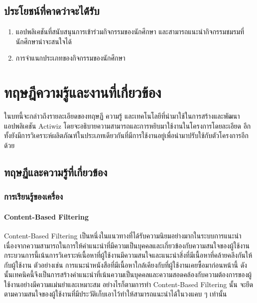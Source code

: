 \documentclass[14pt,oneside,openright,a4paper]{cpe-thai-project}
\begin{document}
\section{ประโยชน์ที่คาดว่าจะได้่รับ}
  \begin{enumerate}
    \item แอปพลิเคชันที่สนับสนุนการเข้าร่วมกิจกรรมของนักศึกษา และสามารถแนะนำกิจกรรมชมรมที่นักศึกษาน่าจะสนใจได้
    \item การจำแนกประเภทของกิจกรรมของนักศึกษา
  \end{enumerate}


\chapter{ทฤษฎีความรู้และงานที่เกี่ยวข้อง}
ในบทนี้จะกล่าวถึงรายละเอียดของทฤษฏี ความรู้ และเทคโนโลยีที่นำมาใช้ในการสร้างและพัฒนาแอปพลิเคชัน Actiwiz โดยจะอธิบายความสามารถและการหยิบมาใช้งานในโครงการโดยละเอียด อีกทั้งยังมีการวิเคราะห์ผลิตภัณฑ์ในประเภทเดียวกันที่มีการใช้งานอยู่เพื่อนำมาปรับใช้กับตัวโครงการอีกด้วย

\section{ทฤษฏีและความรู้ที่เกี่ยวข้อง}
  \subsection {การเรียนรู้ของเครื่อง}
  \subsubsection {Content-Based Filtering}
Content-Based Filtering \cite{Content-Based} เป็นหนึ่งในแนวทางที่ได้รับความนิยมอย่างมากในระบบการแนะนำ เนื่องจากความสามารถในการให้คำแนะนำที่มีความเป็นบุคคลและเกี่ยวข้องกับความสนใจของผู้ใช้งาน 
กระบวนการนี้เน้นการวิเคราะห์เนื้อหาที่ผู้ใช้งานมีความสนใจและแนะนำสิ่งที่มีเนื้อหาที่คล้ายคลึงกันให้กับผู้ใช้งาน ตัวอย่างเช่น การแนะนำหนังสือที่มีเนื้อหาใกล้เคียงกับที่ผู้ใช้งานเคยซื้อมาก่อนหน้านี้ 
ดังนั้นเทคนิคนี้จึงเป็นการสร้างคำแนะนำที่เน้นความเป็นบุคคลและความสอดคล้องกับความต้องการของผู้ใช้งานอย่างมีความแม่นยำและเหมาะสม 
อย่างไรก็ตามการทำ Content-Based Filtering นั้น จะยึดตามความสนใจของผู้ใช้งานที่มีประวัติเก็บเอาไว้ทำให้สามารถแนะนำได้ในวงแคบ ๆ เท่านั้น
\end{document}

